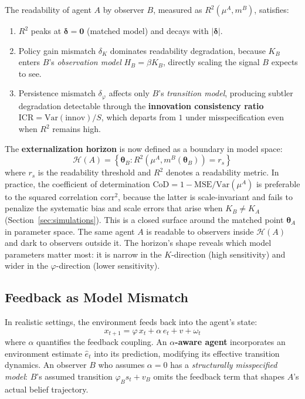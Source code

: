 \documentclass[runningheads]{llncs}
\begin{document}
\begin{proposition}
\label{prop:readability}
The readability of agent $A$ by observer $B$, measured as $R^2(\mu^A, m^B)$, satisfies:
\begin{enumerate}
    \item $R^2$ peaks at $\boldsymbol{\delta} = \mathbf{0}$ (matched model) and decays with $|\boldsymbol{\delta}|$.
    \item Policy gain mismatch $\delta_K$ dominates readability degradation, because $K_B$ enters $B$'s \emph{observation model} $H_B = \beta K_B$, directly scaling the signal $B$ expects to see.
    \item Persistence mismatch $\delta_\varphi$ affects only $B$'s \emph{transition model}, producing subtler degradation detectable through the \textbf{innovation consistency ratio} $\mathrm{ICR} = \mathrm{Var}(\text{innov})/S$, which departs from $1$ under misspecification even when $R^2$ remains high.
\end{enumerate}
\end{proposition}

The \textbf{externalization horizon} is now defined as a boundary in model space:
\begin{equation}
    \mathcal{H}(A) = \left\{ \boldsymbol{\theta}_B : R^2\!\left(\mu^A, m^B(\boldsymbol{\theta}_B)\right) = r_s \right\}
    \label{eq:horizon_model_space}
\end{equation}
where $r_s$ is the readability threshold and $R^2$ denotes a readability metric. In practice, the coefficient of determination $\mathrm{CoD} = 1 - \mathrm{MSE}/\mathrm{Var}(\mu^A)$ is preferable to the squared correlation $\mathrm{corr}^2$, because the latter is scale-invariant and fails to penalize the systematic bias and scale errors that arise when $K_B \neq K_A$ (Section~\ref{sec:simulations}). This is a closed surface around the matched point $\boldsymbol{\theta}_A$ in parameter space. The same agent $A$ is readable to observers inside $\mathcal{H}(A)$ and dark to observers outside it. The horizon's shape reveals which model parameters matter most: it is narrow in the $K$-direction (high sensitivity) and wider in the $\varphi$-direction (lower sensitivity).

\subsection{Feedback as Model Mismatch}
\label{sec:feedback_mismatch}

In realistic settings, the environment feeds back into the agent's state:
\begin{equation}
    x_{t+1} = \varphi \, x_t + \alpha \, e_t + v + \omega_t
    \label{eq:state_feedback}
\end{equation}
where $\alpha$ quantifies the feedback coupling. An \textbf{$\alpha$-aware agent} incorporates an environment estimate $\hat{e}_t$ into its prediction, modifying its effective transition dynamics. An observer $B$ who assumes $\alpha = 0$ has a \emph{structurally misspecified model}: $B$'s assumed transition $\varphi_B s_t + v_B$ omits the feedback term that shapes $A$'s actual belief trajectory.
\end{document}
